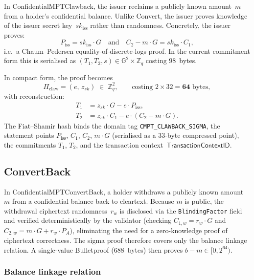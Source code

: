 \documentclass[11pt]{article}
\theoremstyle{definition}
\newcommand{\G}{\mathbb{G}}
\newcommand{\Zq}{\mathbb{Z}_q}
\newcommand{\sk}{\mathit{sk}}
\newcommand{\TransCtx}{\textsf{TransactionContextID}}
\begin{document}
In \textsf{ConfidentialMPTClawback}, the issuer reclaims a publicly
known amount~$m$ from a holder's confidential balance.
Unlike Convert, the issuer proves knowledge of the issuer secret
key~$\sk_{\mathrm{iss}}$ rather than randomness.
Concretely, the issuer proves:
\[
  P_{\mathrm{iss}} = \sk_{\mathrm{iss}} \cdot G
  \quad\text{and}\quad
  C_2 - m \cdot G = \sk_{\mathrm{iss}} \cdot C_1,
\]
i.e.\ a Chaum--Pedersen equality-of-discrete-logs proof.
In the current commitment form this is serialised as
$(T_1, T_2, s) \in \G^2 \times \Zq$ costing $98$~bytes.

In compact form, the proof becomes
\[
  \Pi_{\mathrm{claw}} = (e,\, z_{\sk}) \;\in\; \Zq^2,
  \qquad\text{costing } 2 \times 32 = \mathbf{64}\text{~bytes},
\]
with reconstruction:
\begin{align}
  T_1 &= z_{\sk} \cdot G - e \cdot P_{\mathrm{iss}},
    \label{eq:recon-claw-t1} \\
  T_2 &= z_{\sk} \cdot C_1 - e \cdot (C_2 - m \cdot G).
    \label{eq:recon-claw-t2}
\end{align}
The Fiat--Shamir hash binds the domain tag
\texttt{CMPT\_CLAWBACK\_SIGMA}, the statement points
$P_{\mathrm{iss}}$, $C_1$, $C_2$, $m \cdot G$ (serialised as a
$33$-byte compressed point), the commitments $T_1$, $T_2$, and
the transaction context~$\TransCtx$.

\subsection{ConvertBack}
\label{sec:convertback}

In \textsf{ConfidentialMPTConvertBack}, a holder withdraws a publicly
known amount~$m$ from a confidential balance back to cleartext.
Because $m$ is public, the withdrawal ciphertext randomness~$r_w$ is
disclosed via the \texttt{BlindingFactor} field and verified
deterministically by the validator (checking
$C_{1,w} = r_w \cdot G$ and
$C_{2,w} = m \cdot G + r_w \cdot P_A$), eliminating the need for a
zero-knowledge proof of ciphertext correctness.
The sigma proof therefore covers only the balance linkage relation.
A single-value Bulletproof ($688$~bytes) then proves
$b - m \in [0, 2^{64})$.

\subsubsection*{Balance linkage relation}
\end{document}
